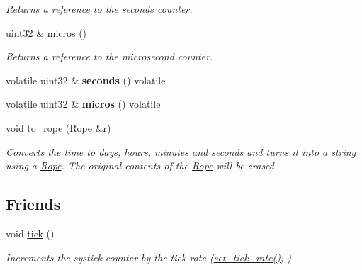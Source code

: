 \begin{DoxyCompactItemize}
\begin{DoxyCompactList}\small\item\em Returns a reference to the seconds counter. \end{DoxyCompactList}\item 
\hypertarget{classetk_1_1_time_a85063099154660cd7eb4400cf2d384bb}{uint32 \& \hyperlink{classetk_1_1_time_a85063099154660cd7eb4400cf2d384bb}{micros} ()}\label{classetk_1_1_time_a85063099154660cd7eb4400cf2d384bb}

\begin{DoxyCompactList}\small\item\em Returns a reference to the microsecond counter. \end{DoxyCompactList}\item 
\hypertarget{classetk_1_1_time_a04af12dcd38687beaaacfca981f58b84}{volatile uint32 \& {\bfseries seconds} () volatile}\label{classetk_1_1_time_a04af12dcd38687beaaacfca981f58b84}

\item 
\hypertarget{classetk_1_1_time_a43d5f8a971624ca74a35974edcf8049d}{volatile uint32 \& {\bfseries micros} () volatile}\label{classetk_1_1_time_a43d5f8a971624ca74a35974edcf8049d}

\item 
void \hyperlink{classetk_1_1_time_af0fabd9a7c37abd196d6c4ea480c7aa4}{to\-\_\-rope} (\hyperlink{classetk_1_1_rope}{Rope} \&r)
\begin{DoxyCompactList}\small\item\em Converts the time to days, hours, minutes and seconds and turns it into a string using a \hyperlink{classetk_1_1_rope}{Rope}. The original contents of the \hyperlink{classetk_1_1_rope}{Rope} will be erased. \end{DoxyCompactList}\end{DoxyCompactItemize}
\subsection*{Friends}
\begin{DoxyCompactItemize}
\item 
\hypertarget{classetk_1_1_time_a873dd91783f9efb4a590aded1f70d6b0}{void \hyperlink{classetk_1_1_time_a873dd91783f9efb4a590aded1f70d6b0}{tick} ()}\label{classetk_1_1_time_a873dd91783f9efb4a590aded1f70d6b0}

\begin{DoxyCompactList}\small\item\em Increments the systick counter by the tick rate (\hyperlink{namespaceetk_a67a8e6e6151a851c1709268b8eff2aa4}{set\-\_\-tick\-\_\-rate()}; ) \end{DoxyCompactList}\end{DoxyCompactItemize}


